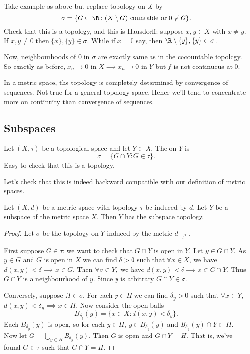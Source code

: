 \begin{example}
Take example as above but replace topology on $X$ by \[\sigma = \{G\subset \R : (X \setminus G) \textup{ countable or } 0\not\in G \}. \]
Check that this is a topology, and this is Hausdorff: suppose $x,y\in X$ with $x\neq y$. If $x,y\neq 0$ then $\{x\}, \{y\}\in \sigma$. While if $x=0$ say, then $\R \setminus \{y\}, \{y\}\in \sigma$.

Now, neighbourhoods of $0$ in $\sigma$ are exactly same as in the cocountable topology. So exactly as before, $x_n \to 0$ in $X\implies x_n \to 0$ in $Y$ but $f$ is not continuous at $0$.
\end{example}
\begin{remark}
In a metric space, the topology is completely determined by convergence of sequences. Not true for a general topology space. Hence we'll tend to concentrate more on continuity than convergence of sequences.
\end{remark}

\subsection{Subspaces}
\begin{definition}
Let $(X,\tau)$ be a topological space and let $Y\subset X$. The  on $Y$ is \[ \sigma = \{G\cap Y : G\in \tau \}.\] Easy to check that this is a topology.
\end{definition}

Let's check that this is indeed backward compatible with our definition of metric spaces.

\begin{proposition} \label{prp:31}
Let $(X,d)$ be a metric space with topology $\tau$ be induced by $d$. Let $Y$ be a subspace of the metric space $X$. Then $Y$ has the subspace topology.
\end{proposition}
\begin{proof}
Let $\sigma$ be the topology on $Y$ induced by the metric $d\mid_{Y^2}$.

First suppose $G\in \tau$; we want to check that $G\cap Y$ is open in $Y$. Let $y\in G\cap Y$. As $y\in G$ and $G$ is open in $X$ we can find $\delta >0$ such that $\forall x\in X$, we have $d(x,y)<\delta \implies x\in G$. Then $\forall x\in Y,$ we have $d(x,y)<\delta \implies x \in G\cap Y$. Thus $G\cap Y$ is a neighbourhood of $y$. Since $y$ is arbitrary $G\cap Y\in \sigma$.

Conversely, suppose $H\in \sigma$. For each $y\in H$ we can find $\delta_y>0$ such that $\forall x\in Y$, $d(x,y)<\delta_y\implies x\in H$. Now consider the open balls\[B_{\delta_y}(y) = \{x\in X : d(x,y) < \delta_y\}. \] Each $B_{\delta_y}(y)$ is open, so for each $y\in H$, $y\in B_{\delta_y}(y)$ and $B_{\delta_y}(y)\cap Y\subset H$. Now let $G = \bigcup_{y\in H}B_{\delta_y}(y)$. Then $G$ is open and $G\cap Y= H$. That is, we've found $G\in \tau$ such that $G\cap Y = H$.
\end{proof}

